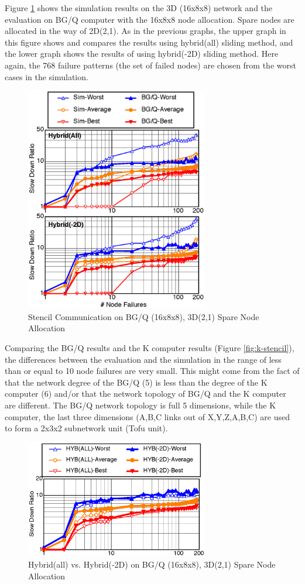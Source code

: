 \documentclass[Afour,times,sageh]{sagej}
\begin{document}
Figure \ref{fig:bgq-stencil} shows the simulation results on the
3D (16x8x8) network and the evaluation on BG/Q computer with the 16x8x8
node allocation. Spare nodes are allocated in the way of
2D(2,1). As in the previous graphs, the upper graph in this figure
shows and compares the results using hybrid(all) sliding method, and
the lower graph shows the results of using hybrid(-2D) sliding
method. Here again, the 768 failure patterns (the set of failed nodes)
are chosen from the worst cases in the simulation.

\begin{figure}[ht]
\centering
\includegraphics[width=80mm]{Figs/BGQ-Stencil-CL.eps}
  \caption{Stencil Communication on BG/Q (16x8x8), 3D(2,1) Spare Node
    Allocation}
  \label{fig:bgq-stencil}
\end{figure}

Comparing the BG/Q results and the K computer results (Figure
\ref{fig:k-stencil}), the differences between the evaluation and the
simulation in the range of less than or equal to 10 node failures are
very small. This might come from the fact of that the network degree
of the BG/Q (5) is less than the degree of the K computer (6) and/or
that the network topology of BG/Q and the K computer are different.
The BG/Q network topology is full 5 dimensions, while the K computer,
the last three dimensions (A,B,C links out of X,Y,Z,A,B,C) are used to
form a 2x3x2 subnetwork unit (Tofu unit).

\begin{figure}[ht]
\centering
\includegraphics[width=80mm]{Figs/BGQ-comparison-CL.eps}
  \caption{Hybrid(all) vs. Hybrid(-2D) on BG/Q (16x8x8), 3D(2,1) Spare
    Node Allocation}
  \label{fig:bgq-comparison}
\end{figure}
\end{document}
